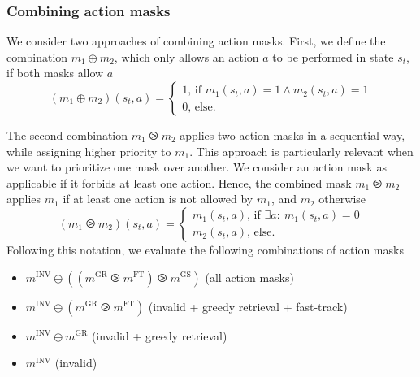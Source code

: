 \documentclass[11pt]{elsarticle}
\begin{document}
\subsubsection*{Combining action masks}

We consider two approaches of combining action masks. First, we define the combination $m_1 \oplus m_2$, which only allows an action $a$ to be performed in state $s_t$, if both masks allow $a$
\begin{equation}
(m_1 \oplus m_2)(s_t,a)=\begin{cases}
			1 \text{, if } m_1(s_t,a)=1 \land m_2(s_t,a)=1 \\
			0 \text{, else}.	
			\end{cases}
\end{equation}

The second combination $m_1 \ogreaterthan m_2$ applies two action masks in a sequential way, while assigning higher priority to $m_1$. This approach is particularly relevant when we want to prioritize one mask over another. We consider an action mask as applicable if it forbids at least one action. Hence, the combined mask $m_1 \ogreaterthan m_2$ applies $m_1$ if at least one action is not allowed by $m_1$, and $m_2$ otherwise
\begin{equation}
(m_1 \ogreaterthan m_2)(s_t,a)=\begin{cases}
			m_1(s_t,a) \text{, if } \exists a{:} \ m_1(s_t,a) = 0 \\
			m_2(s_t,a) \text{, else}.			
			\end{cases} 
\end{equation}
Following this notation, we evaluate the following combinations of action masks
\begin{itemize}
\item $m^{\text{INV}}\oplus  \left( \left(m^{\text{GR}} \ogreaterthan m^{\text{FT}} \right) \ogreaterthan m^{\text{GS}} \right)  $ (all action masks)
\item $m^{\text{INV}}\oplus \left(m^{\text{GR}} \ogreaterthan m^{\text{FT}} \right) $ (invalid + greedy retrieval + fast-track)
\item $m^{\text{INV}}\oplus m^{\text{GR}}$ (invalid + greedy retrieval)
\item $m^{\text{INV}}$ (invalid)
\end{itemize}
\end{document}
